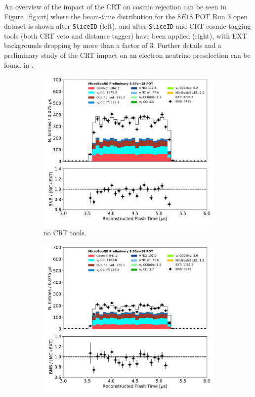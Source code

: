 An overview of the impact of the CRT on cosmic rejection can be seen in Figure~\ref{fig:crt} where the beam-time distribution for the $8E18$ POT Run 3 open dataset is shown after \texttt{SliceID} (left), and after \texttt{SliceID} and CRT cosmic-tagging tools (both CRT veto and distance tagger) have been applied (right), with EXT backgrounds dropping by more than a factor of 3.
Further details and a preliminary study of the CRT  impact on an electron neutrino preselection can be found in \cite{bib:CRTPresel_Technote}. 

\begin{figure}[ht] 
\begin{center}
    \begin{subfigure}[b]{0.4\textwidth}
    \centering
    \includegraphics[width=1.00\textwidth]{NuId-Ch3/Images/flash_time_01152020.pdf}
    \caption{\label{fig:crt:pre} no CRT tools.}
    \end{subfigure}
    \begin{subfigure}[b]{0.4\textwidth}
    \centering
    \includegraphics[width=1.00\textwidth]{NuId-Ch3/Images/flash_time_01152020_CRT.pdf}

\end{subfigure}
\end{center}
\end{figure}
